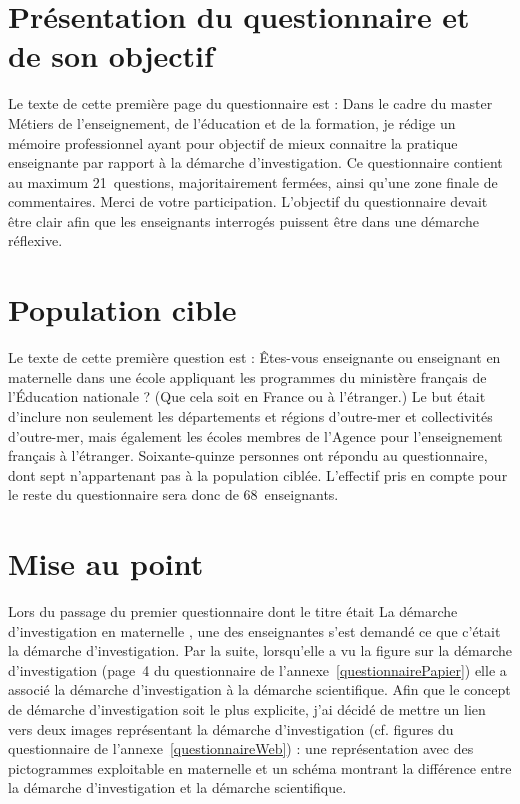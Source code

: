 \section{Présentation du questionnaire et de son objectif}
Le texte de cette première page du questionnaire est : \og Dans le cadre du master Métiers de l’enseignement, de l’éducation et de la formation, je rédige un mémoire professionnel ayant pour objectif de mieux connaitre la pratique enseignante par rapport à la démarche d’investigation. Ce questionnaire contient au maximum 21~questions, majoritairement fermées, ainsi qu’une zone finale de commentaires. Merci de votre participation. \fg{} L’objectif du questionnaire devait être clair afin que les enseignants interrogés puissent être dans une démarche réflexive.

\section{Population cible}
Le texte de cette première question est : \og Êtes-vous enseignante ou enseignant en maternelle dans une école appliquant les programmes du ministère français de l’Éducation nationale ? (Que cela soit en France ou à l’étranger.) \fg{} Le but était d’inclure non seulement les départements et régions d’outre-mer et collectivités d’outre-mer, mais également les écoles membres de l’Agence pour l’enseignement français à l’étranger. Soixante-quinze personnes ont répondu au questionnaire, dont sept n’appartenant pas à la population ciblée. L’effectif pris en compte pour le reste du questionnaire sera donc de 68~enseignants.

\section{Mise au point}
Lors du passage du premier questionnaire dont le titre était \og La démarche d’investigation en maternelle \fg{}, une des enseignantes s’est demandé ce que c’était la démarche d’investigation. Par la suite, lorsqu’elle a vu la figure sur la démarche d’investigation (page~4 du questionnaire de l’annexe~\ref{questionnairePapier}) elle a associé la démarche d’investigation à la démarche scientifique. Afin que le concept de démarche d’investigation soit le plus explicite, j’ai décidé de mettre un lien vers deux images représentant la démarche d’investigation (cf. figures du questionnaire de l’annexe~\ref{questionnaireWeb}) : une représentation avec des pictogrammes exploitable en maternelle et un schéma montrant la différence entre la démarche d’investigation et la démarche scientifique.

